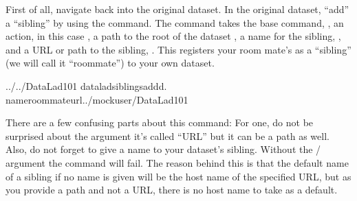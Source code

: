 \ignorespaces 
\sphinxAtStartPar
First of all, navigate back into the original dataset.
In the original dataset, “add” a “sibling” by using
the  command.
The command takes the base command,
, an action, in this case , a path to the
root of the dataset , a name for the sibling, ,
and a URL or path to the sibling, .
This registers your room mate’s  as a “sibling” (we will call it
“roommate”) to your own  dataset.

\begin{sphinxVerbatim}[commandchars=\\\{\}]
../../DataLad\PYGZhy{}101
dataladsiblingsadd\PYGZhy{}d.
\PYGZhy{}\PYGZhy{}nameroommate\PYGZhy{}\PYGZhy{}url../mock\PYGZus{}user/DataLad\PYGZhy{}101
\end{sphinxVerbatim}

\sphinxAtStartPar
There are a few confusing parts about this command: For one, do not be surprised
about the  argument \textendash{} it’s called “URL” but it can be a path as well.
Also, do not forget to give a name to your dataset’s sibling. Without the /
 argument the command will fail. The reason behind this is that the default
name of a sibling if no name is given will be the host name of the specified URL,
but as you provide a path and not a URL, there is no host name to take as a default.


